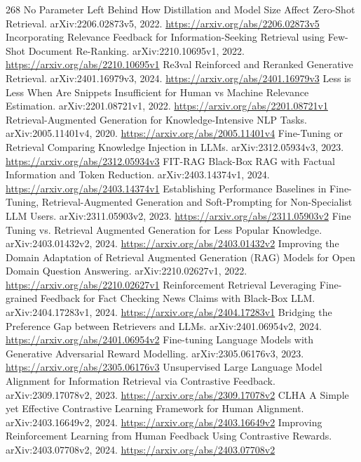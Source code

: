 \documentclass[11pt]{article}
\begin{document}
\begin{thebibliography}{268}
 No Parameter Left Behind How Distillation and Model Size Affect Zero-Shot Retrieval. arXiv:2206.02873v5, 2022. \url{https://arxiv.org/abs/2206.02873v5}
 Incorporating Relevance Feedback for Information-Seeking Retrieval using Few-Shot Document Re-Ranking. arXiv:2210.10695v1, 2022. \url{https://arxiv.org/abs/2210.10695v1}
 Re3val Reinforced and Reranked Generative Retrieval. arXiv:2401.16979v3, 2024. \url{https://arxiv.org/abs/2401.16979v3}
 Less is Less When Are Snippets Insufficient for Human vs Machine Relevance Estimation. arXiv:2201.08721v1, 2022. \url{https://arxiv.org/abs/2201.08721v1}
 Retrieval-Augmented Generation for Knowledge-Intensive NLP Tasks. arXiv:2005.11401v4, 2020. \url{https://arxiv.org/abs/2005.11401v4}
 Fine-Tuning or Retrieval Comparing Knowledge Injection in LLMs. arXiv:2312.05934v3, 2023. \url{https://arxiv.org/abs/2312.05934v3}
 FIT-RAG Black-Box RAG with Factual Information and Token Reduction. arXiv:2403.14374v1, 2024. \url{https://arxiv.org/abs/2403.14374v1}
 Establishing Performance Baselines in Fine-Tuning, Retrieval-Augmented Generation and Soft-Prompting for Non-Specialist LLM Users. arXiv:2311.05903v2, 2023. \url{https://arxiv.org/abs/2311.05903v2}
 Fine Tuning vs. Retrieval Augmented Generation for Less Popular Knowledge. arXiv:2403.01432v2, 2024. \url{https://arxiv.org/abs/2403.01432v2}
 Improving the Domain Adaptation of Retrieval Augmented Generation (RAG) Models for Open Domain Question Answering. arXiv:2210.02627v1, 2022. \url{https://arxiv.org/abs/2210.02627v1}
 Reinforcement Retrieval Leveraging Fine-grained Feedback for Fact Checking News Claims with Black-Box LLM. arXiv:2404.17283v1, 2024. \url{https://arxiv.org/abs/2404.17283v1}
 Bridging the Preference Gap between Retrievers and LLMs. arXiv:2401.06954v2, 2024. \url{https://arxiv.org/abs/2401.06954v2}
 Fine-tuning Language Models with Generative Adversarial Reward Modelling. arXiv:2305.06176v3, 2023. \url{https://arxiv.org/abs/2305.06176v3}
 Unsupervised Large Language Model Alignment for Information Retrieval via Contrastive Feedback. arXiv:2309.17078v2, 2023. \url{https://arxiv.org/abs/2309.17078v2}
 CLHA A Simple yet Effective Contrastive Learning Framework for Human Alignment. arXiv:2403.16649v2, 2024. \url{https://arxiv.org/abs/2403.16649v2}
 Improving Reinforcement Learning from Human Feedback Using Contrastive Rewards. arXiv:2403.07708v2, 2024. \url{https://arxiv.org/abs/2403.07708v2}

\end{thebibliography}
\end{document}

